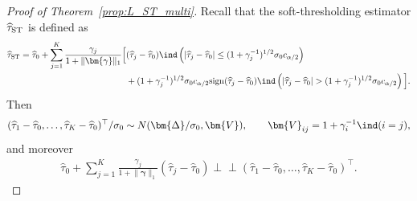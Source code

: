 \documentclass[11pt]{article}
\newcommand{\indep}{\perp \!\!\!\perp}
\newcommand{\htau}{\widehat\tau}
\numberwithin{equation}{section}
\theoremstyle{definition}
\begin{document}
\begin{proof}[Proof of Theorem~\ref{prop:L_ST_multi}]
Recall that the soft-thresholding estimator $\htau_{\rm ST}$ is defined as
\begin{align*}
  \htau_{\rm ST}= \htau_0 + \sum_{j=1}^K \frac{\gamma_j}{1+\lVert \bm{\gamma} \rVert_1} \Big[&(\htau_j - \htau_0) \ind\left(\lvert \htau_j - \htau_0 \rvert \le (1+\gamma_j^{-1})^{1/2}\sigma_0 c_{\alpha/2}\right) \\
  &+ (1+\gamma_j^{-1})^{1/2}\sigma_0 c_{\alpha/2} {\rm sign}(\htau_j - \htau_0) \ind\left(\lvert \htau_j - \htau_0 \rvert > (1+\gamma_j^{-1})^{1/2}\sigma_0 c_{\alpha/2}\right) \Big].
\end{align*}
Then
\begin{align*}
  (\htau_1 - \htau_0, \ldots, \htau_K - \htau_0)^\top/\sigma_0 \sim N(\bm{\Delta}/\sigma_0, \bm{V}), \qquad \bm{V}_{ij}=1+\gamma_i^{-1}\ind(i=j),
\end{align*}
and moreover
\begin{align*}
  \htau_0 + \sum_{j=1}^K \frac{\gamma_j}{1+\lVert \bm{\gamma} \rVert_1} (\htau_j - \htau_0) \indep  (\htau_1 - \htau_0, \ldots, \htau_K - \htau_0)^\top.
\end{align*}


\end{proof}
\end{document}
